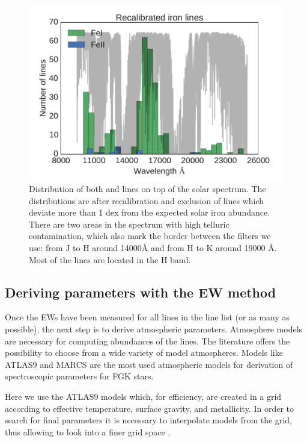 \documentclass{aa}
\begin{document}
\begin{figure}[tpb]
    \centering
    \includegraphics[width=1.05\linewidth]{figures/EWvsEP_cut.pdf}
    \caption{Distribution of both  and  lines on top of the solar
    spectrum. The distributions are after recalibration and exclusion
    of lines which deviate more than 1 dex from the expected solar iron
    abundance. There are two areas in the spectrum with high telluric
    contamination, which also mark the border between the filters we
    use: from J to H around 14000\si{\angstrom} and from H to K around
    19000 \si{\angstrom}. Most of the lines are located in the H band.}
    \label{fig:Fe1_after_recal}
\end{figure}



\subsection{Deriving parameters with the EW method}
\label{sec:deriving_parameters_with_the_ew_method}

Once the EWs have been measured for all lines in the line list (or as
many as possible), the next step is to derive atmospheric parameters.
Atmosphere models are necessary for computing abundances of the lines.
The literature offers the possibility to choose from a wide variety
of model atmospheres. Models like ATLAS9 \citep{Kurucz1993} and
MARCS \citep{Gustafson2008} are the most used atmospheric models for
derivation of spectroscopic parameters for FGK stars.

Here we use the ATLAS9 models which, for efficiency, are created
in a grid according to effective temperature, surface gravity, and
metallicity. In order to search for final parameters it is necessary to
interpolate models from the grid, thus allowing to look into a finer
grid space \citep[see e.g.][]{Sousa2014}.
\end{document}

